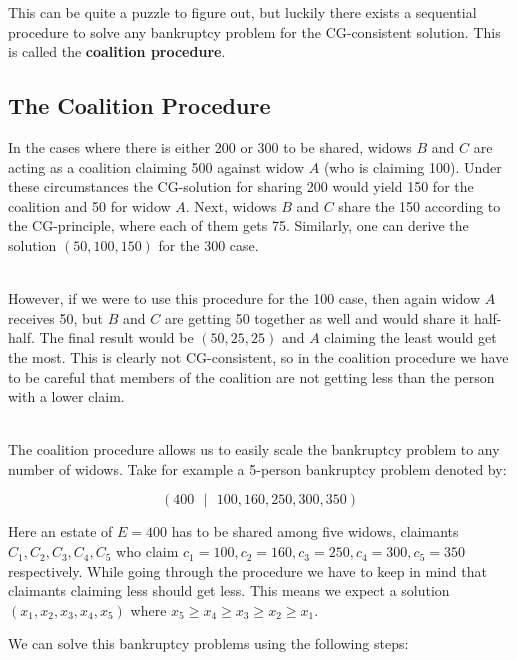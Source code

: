 \documentclass[12pt]{article}
\begin{document}
\noindent
This can be quite a puzzle to figure out, but luckily there exists a sequential procedure to solve any bankruptcy problem for the CG-consistent solution.
This is called the \textbf{coalition procedure}.

\subsection{The Coalition Procedure}
In the cases where there is either 200 or 300 to be shared, widows $B$ and $C$ are acting as a coalition claiming 500 against widow $A$ (who is claiming 100).
Under these circumstances the CG-solution for sharing 200 would yield 150 for the coalition and 50 for widow $A$.
Next, widows $B$ and $C$ share the 150 according to the CG-principle, where each of them gets 75.
Similarly, one can derive the solution $(50, 100, 150)$ for the 300 case.

\noindent
\\
However, if we were to use this procedure for the 100 case, then again widow $A$ receives 50, but $B$ and $C$ are getting 50 together as well and would share it half-half.
The final result would be $(50, 25, 25)$ and $A$ claiming the least would get the most.
This is clearly not CG-consistent, so in the coalition procedure we have to be careful that members of the coalition are not getting less than the person with a lower claim.

\noindent
\\
The coalition procedure allows us to easily scale the bankruptcy problem to any number of widows.
Take for example a 5-person bankruptcy problem denoted by:

\[ (400 \text{ } | \text{ } 100, 160, 250, 300, 350) \]

\noindent
Here an estate of $E = 400$ has to be shared among five widows, claimants $C_1, C_2, C_3, C_4, C_5$ who claim $c_1 = 100, c_2 = 160, c_3 = 250, c_4 = 300, c_5 = 350$ respectively.
While going through the procedure we have to keep in mind that claimants claiming less should get less.
This means we expect a solution $(x_1, x_2, x_3, x_4, x_5)$ where $x_5 \geq x_4 \geq x_3 \geq x_2 \geq x_1$.

\newpage
\noindent
We can solve this bankruptcy problems using the following steps:
\end{document}
